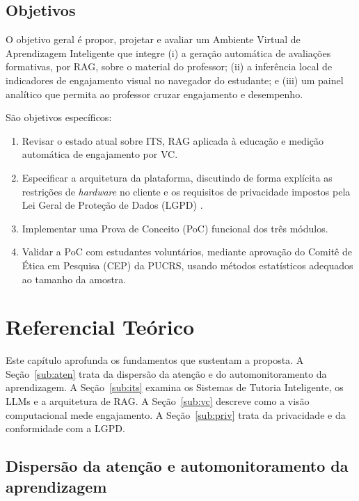 \documentclass[portuguese,oneside]{tcc}
\begin{document}
\section{Objetivos}

O objetivo geral é propor, projetar e avaliar um Ambiente Virtual de Aprendizagem Inteligente que integre (i) a geração automática de avaliações formativas, por RAG, sobre o material do professor; (ii) a inferência local de indicadores de engajamento visual no navegador do estudante; e (iii) um painel analítico que permita ao professor cruzar engajamento e desempenho.

São objetivos específicos:
\begin{enumerate}
  \item Revisar o estado atual sobre ITS, RAG aplicada à educação e medição automática de engajamento por VC.
  \item Especificar a arquitetura da plataforma, discutindo de forma explícita as restrições de \emph{hardware} no cliente e os requisitos de privacidade impostos pela Lei Geral de Proteção de Dados (LGPD) \cite{Bra18}.
  \item Implementar uma Prova de Conceito (PoC) funcional dos três módulos.
  \item Validar a PoC com estudantes voluntários, mediante aprovação do Comitê de Ética em Pesquisa (CEP) da PUCRS, usando métodos estatísticos adequados ao tamanho da amostra.
\end{enumerate}

\chapter{\label{sec:ref}Referencial Teórico}

Este capítulo aprofunda os fundamentos que sustentam a proposta. A Seção~\ref{sub:aten} trata da dispersão da atenção e do automonitoramento da aprendizagem. A Seção~\ref{sub:its} examina os Sistemas de Tutoria Inteligente, os LLMs e a arquitetura de RAG. A Seção~\ref{sub:vc} descreve como a visão computacional mede engajamento. A Seção~\ref{sub:priv} trata da privacidade e da conformidade com a LGPD.

\section{\label{sub:aten}Dispersão da atenção e automonitoramento da aprendizagem}
\end{document}
